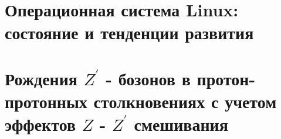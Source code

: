 \documentclass[12pt,a4paper]{styles/report}
\begin{document}


\newpage
\pagestyle{plain}  \setcounter{page}{2}
\large \tableofcontents



\chapter{Операционная система Linux: состояние и тенденции развития}






\chapter{Рождения $Z^\prime$ - бозонов в протон-протонных столкновениях с учетом эффектов $Z$ - $Z^\prime$ смешивания}



\end{document}
